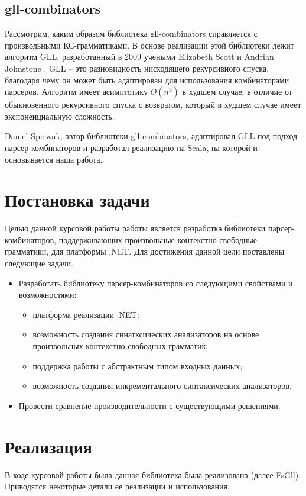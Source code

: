 \documentclass[14pt]{matmex-diploma}
\begin{document}
\subsection{gll-combinators}
Рассмотрим, каким образом библиотека gll-combinators справляется с произвольными КС-грамматиками.
В основе реализации этой библиотеки лежит алгоритм GLL, 
  разработанный в 2009 учеными Elizabeth Scott и Andrian Johnstone \cite{gllsj}. 
GLL – это разновидность нисходящего рекурсивного спуска, 
  благодаря чему он может быть адаптирован для использования комбинаторами парсеров. 
Алгоритм имеет асимптотику  $O(n^3)$ в худшем случае, в отличие от обыкновенного 
  рекурсивного спуска с возвратом, который в худшем случае имеет экспоненциальную сложность.
  
Daniel Spiewak, автор библиотеки gll-combinators, адаптировал  GLL 
  под подход парсер-комбинаторов и разработал реализацию на Scala, на которой и основывается наша работа. 
  


\section{Постановка задачи}
Целью данной курсовой работы работы является разработка библиотеки парсер-комбинаторов,
поддерживающих произвольные контекстно свободные грамматики, для платформы .NET.
Для достижения данной цели поставлены следующие задачи.
\begin{itemize}
    \item Разработать библиотеку парсер-комбинаторов со следующими свойствами и возможностями:
    \begin{itemize}
        \item платформа реализации .NET;
        \item возможность создания синатксических анализаторов на основе произвольных контекстно-свободных грамматик;
        \item поддержка работы с абстрактным типом входных данных;
        \item возможность создания инкрементального синтаксических анализаторов.
    \end{itemize}
    \item Провести сравнение производительности с существующими решениями.
\end{itemize}


\section{Реализация}
В ходе курсовой работы была данная библиотека была реализована (далее FsGll). Приводятся некоторые детали ее реализации и использования.
\end{document}

